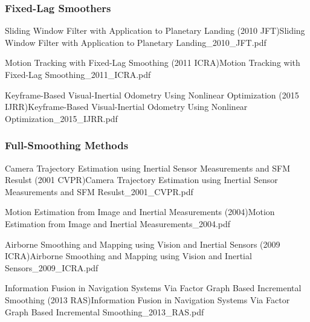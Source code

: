 \documentclass[10pt,a4paper]{scrartcl}
\begin{document}
\begin{multicols*}{2}
\subsubsection{Fixed-Lag Smoothers}

\begin{Paper}{Sliding Window Filter with Application to Planetary Landing (2010 JFT)}{Sliding Window Filter with Application to Planetary Landing_2010_JFT.pdf}
\end{Paper}

\begin{Paper}{Motion Tracking with Fixed-Lag Smoothing (2011 ICRA)}{Motion Tracking with Fixed-Lag Smoothing_2011_ICRA.pdf}
\end{Paper}

\begin{Paper}{Keyframe-Based Visual-Inertial Odometry Using Nonlinear Optimization (2015 IJRR)}{Keyframe-Based Visual-Inertial Odometry Using Nonlinear Optimization_2015_IJRR.pdf}
\end{Paper}

\subsubsection{Full-Smoothing Methods}

\begin{Paper}{Camera Trajectory Estimation using Inertial Sensor Measurements and SFM Resulst (2001 CVPR)}{Camera Trajectory Estimation using Inertial Sensor Measurements and SFM Resulst_2001_CVPR.pdf}
\end{Paper}

\begin{Paper}{Motion Estimation from Image and Inertial Measurements (2004)}{Motion Estimation from Image and Inertial Measurements_2004.pdf}
\end{Paper}

\begin{Paper}{Airborne Smoothing and Mapping using Vision and Inertial Sensors (2009 ICRA)}{Airborne Smoothing and Mapping using Vision and Inertial Sensors_2009_ICRA.pdf}
\end{Paper}

\begin{Paper}{Information Fusion in Navigation Systems Via Factor Graph Based Incremental Smoothing (2013 RAS)}{Information Fusion in Navigation Systems Via Factor Graph Based Incremental Smoothing_2013_RAS.pdf}
\end{Paper}


\end{multicols*}
\end{document}
